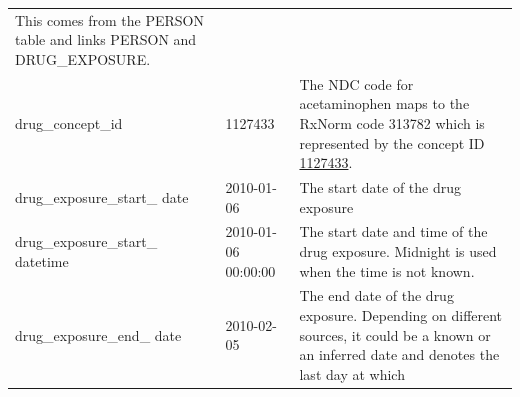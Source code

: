 \documentclass[11pt]{book}
\begin{document}
\begin{longtable}[]{@{}lll@{}}
\begin{minipage}[t]{0.48\columnwidth}
This comes from the PERSON table and links PERSON and
DRUG\_EXPOSURE.\strut
\end{minipage}\tabularnewline
\begin{minipage}[t]{0.28\columnwidth}\raggedright\strut
drug\_concept\_id\strut
\end{minipage} & \begin{minipage}[t]{0.16\columnwidth}\raggedright\strut
1127433\strut
\end{minipage} & \begin{minipage}[t]{0.48\columnwidth}\raggedright\strut
The NDC code for acetaminophen maps to the RxNorm code 313782 which is
represented by the concept ID
\href{http://athena.ohdsi.org/search-terms/terms/1127433}{1127433}.\strut
\end{minipage}\tabularnewline
\begin{minipage}[t]{0.28\columnwidth}\raggedright\strut
drug\_exposure\_start\_ date\strut
\end{minipage} & \begin{minipage}[t]{0.16\columnwidth}\raggedright\strut
2010-01-06\strut
\end{minipage} & \begin{minipage}[t]{0.48\columnwidth}\raggedright\strut
The start date of the drug exposure\strut
\end{minipage}\tabularnewline
\begin{minipage}[t]{0.28\columnwidth}\raggedright\strut
drug\_exposure\_start\_ datetime\strut
\end{minipage} & \begin{minipage}[t]{0.16\columnwidth}\raggedright\strut
2010-01-06 00:00:00\strut
\end{minipage} & \begin{minipage}[t]{0.48\columnwidth}\raggedright\strut
The start date and time of the drug exposure. Midnight is used when the
time is not known.\strut
\end{minipage}\tabularnewline
\begin{minipage}[t]{0.28\columnwidth}\raggedright\strut
drug\_exposure\_end\_ date\strut
\end{minipage} & \begin{minipage}[t]{0.16\columnwidth}\raggedright\strut
2010-02-05\strut
\end{minipage} & \begin{minipage}[t]{0.48\columnwidth}\raggedright\strut
The end date of the drug exposure. Depending on different sources, it
could be a known or an inferred date and denotes the last day at which

\end{minipage}
\end{longtable}
\end{document}
